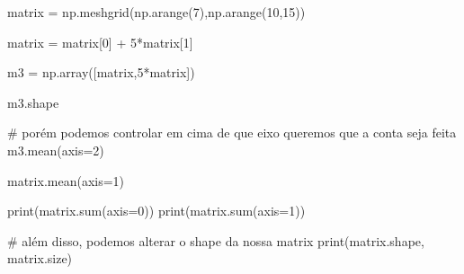\documentclass[
  letterpaper,
  DIV=11,
  numbers=noendperiod]{scrreprt}
\newenvironment{Shaded}{\begin{snugshade}}{\end{snugshade}}
\newcommand{\NormalTok}[1]{\textcolor[rgb]{0.00,0.23,0.31}{#1}}
\begin{document}
\begin{Shaded}
\begin{Highlighting}[]
\NormalTok{matrix = np.meshgrid(np.arange(7),np.arange(10,15))}
\end{Highlighting}
\end{Shaded}

\begin{Shaded}
\begin{Highlighting}[]
\NormalTok{matrix = matrix[0] + 5*matrix[1]  }
\end{Highlighting}
\end{Shaded}

\begin{Shaded}
\begin{Highlighting}[]
\NormalTok{m3 = np.array([matrix,5*matrix])}
\end{Highlighting}
\end{Shaded}

\begin{Shaded}
\begin{Highlighting}[]
\NormalTok{m3.shape}
\end{Highlighting}
\end{Shaded}

\begin{Shaded}
\begin{Highlighting}[]
\NormalTok{\# porém podemos controlar em cima de que eixo queremos que a conta seja feita}
\NormalTok{m3.mean(axis=2)}
\end{Highlighting}
\end{Shaded}

\begin{Shaded}
\begin{Highlighting}[]
\NormalTok{matrix.mean(axis=1)}
\end{Highlighting}
\end{Shaded}

\begin{Shaded}
\begin{Highlighting}[]
\NormalTok{print(matrix.sum(axis=0))}
\NormalTok{print(matrix.sum(axis=1))}
\end{Highlighting}
\end{Shaded}

\begin{Shaded}
\begin{Highlighting}[]
\NormalTok{\# além disso, podemos alterar o shape da nossa matrix}
\NormalTok{print(matrix.shape, matrix.size)}
\end{Highlighting}
\end{Shaded}
\end{document}
